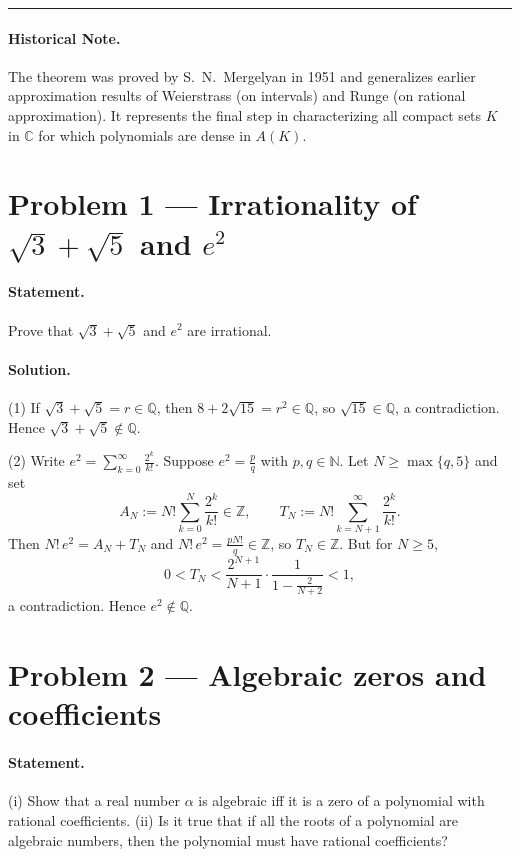 \documentclass[12pt,a4paper]{article}
\theoremstyle{plain}
\theoremstyle{definition}
\theoremstyle{remark}
\theoremstyle{remark}
\begin{document}
\noindent\rule{\textwidth}{0.4pt}

\paragraph{Historical Note.}
The theorem was proved by S.\ N.\ Mergelyan in 1951 and generalizes earlier
approximation results of Weierstrass (on intervals) and Runge (on rational approximation).
It represents the final step in characterizing all compact sets $K$ in $\mathbb{C}$
for which polynomials are dense in $A(K)$.
	
	


\section*{Problem 1 — Irrationality of $\sqrt3+\sqrt5$ and $e^2$}

\paragraph{Statement.}
Prove that $\sqrt3+\sqrt5$ and $e^2$ are irrational.

\paragraph{Solution.}
(1) If $\sqrt3+\sqrt5=r\in\mathbb Q$, then
$8+2\sqrt{15}=r^2\in\mathbb Q$, so $\sqrt{15}\in\mathbb Q$, a contradiction.
Hence $\sqrt3+\sqrt5\notin\mathbb Q$.

(2) Write $e^2=\sum_{k=0}^\infty \frac{2^k}{k!}$. Suppose $e^2=\frac pq$ with $p,q\in\mathbb N$.
Let $N\ge\max\{q,5\}$ and set
\[
A_N:=N!\sum_{k=0}^{N}\frac{2^k}{k!}\in\mathbb Z,\qquad
T_N:=N!\sum_{k=N+1}^{\infty}\frac{2^k}{k!}.
\]
Then $N!\,e^2=A_N+T_N$ and $N!\,e^2=\frac{pN!}{q}\in\mathbb Z$, so $T_N\in\mathbb Z$.
But for $N\ge5$,
\[
0<T_N<\frac{2^{N+1}}{N+1}\cdot\frac{1}{1-\frac{2}{N+2}}<1,
\]
a contradiction. Hence $e^2\notin\mathbb Q$.

\bigskip
\section*{Problem 2 — Algebraic zeros and coefficients}

\paragraph{Statement.}
(i) Show that a real number $\alpha$ is algebraic iff it is a zero of a polynomial with rational coefficients.
(ii) Is it true that if all the roots of a polynomial are algebraic numbers, then the polynomial must
have rational coefficients?
\end{document}
